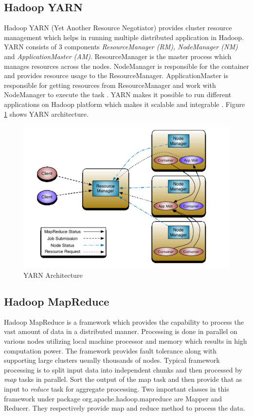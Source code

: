 \documentclass[sigconf]{acmart}
\begin{document}
\subsection{Hadoop YARN}
Hadoop YARN (Yet Another Resource Negotiator) provides cluster resource management which helps in running multiple distributed application in Hadoop. YARN consists of 3 components \emph{ResourceManager (RM), NodeManager (NM)} and \emph{ApplicationMaster (AM)}. ResourceManager is the master process which manages resources across the nodes. NodeManager is responsible for the container and provides resource usage to the ResourceManager. ApplicationMaster is responsible for getting resources from ResourceManager and work with NodeManager to execute the task \cite{www-apache-yarn}. YARN makes it possible to run different applications on Hadoop platform which makes it scalable and integrable \cite[Ch.\ 3, p. 65]{AchariShiva2015HE}.
Figure \ref{f:yarn-arch} shows YARN architecture.
\begin{figure}[!ht]
  \centering\includegraphics[width=\columnwidth]{images/yarnArch.PNG}
  \caption{YARN Architecture \cite{www-apache-yarn}}\label{f:yarn-arch}
\end{figure}

\subsection{Hadoop MapReduce}
Hadoop MapReduce is a framework which provides the capability to process the vast amount of data in a distributed manner. Processing is done in parallel on various nodes utilizing local machine processor and memory which results in high computation power. The framework provides fault tolerance along with supporting large clusters usually thousands of nodes. Typical framework processing is to split input data into independent chunks and then processed by \emph{map} tasks in parallel. Sort the output of the map task and then provide that as input to \emph{reduce} task for aggregate processing. Two important classes in this framework under package org.apache.hadoop.mapreduce are Mapper and Reducer. They respectively provide map and reduce method to process the data. 
\end{document}

